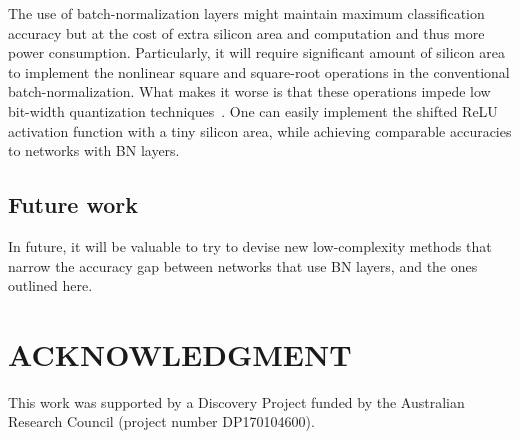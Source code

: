 \documentclass[conference]{IEEEtran}
\begin{document}
The use of batch-normalization layers might maintain maximum classification accuracy but at the cost of extra silicon area and  computation and thus more power consumption. Particularly, it will require significant amount of silicon area to implement the nonlinear square and square-root operations in the conventional batch-normalization. What makes it worse is that these operations impede low bit-width quantization techniques~\cite{Ando.17}. One can easily implement the shifted ReLU activation function with a tiny silicon area, while achieving comparable accuracies to networks with BN layers.

\subsection{Future work}

In future, it will be valuable to try to devise new low-complexity methods that narrow the accuracy gap between networks that use BN layers, and the ones outlined here. 




\section*{ACKNOWLEDGMENT}

This work was supported by a Discovery Project funded by the Australian Research Council (project number DP170104600).
\end{document}
